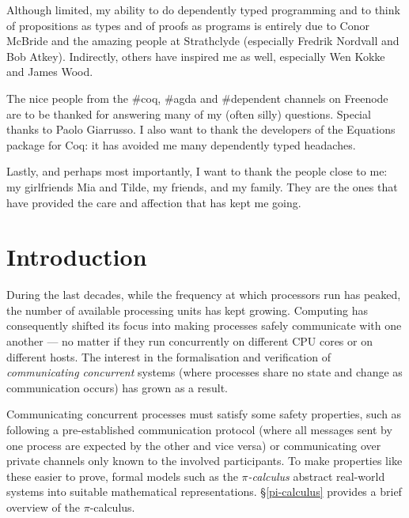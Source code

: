 \documentclass{mproj}
\newcommand{\picalc}{$\pi$-calculus}
\begin{document}
Although limited, my ability to do dependently typed programming and to think of propositions as types and of proofs as programs is entirely due to Conor McBride and the amazing people at Strathclyde (especially Fredrik Nordvall and Bob Atkey). Indirectly, others have inspired me as well, especially Wen Kokke and James Wood.

The nice people from the \#coq, \#agda and \#dependent channels on Freenode are to be thanked for answering many of my (often silly) questions. Special thanks to Paolo Giarrusso. I also want to thank the developers of the Equations package for Coq: it has avoided me many dependently typed headaches.

Lastly, and perhaps most importantly, I want to thank the people close to me: my girlfriends Mia and Tilde, my friends, and my family. They are the ones that have provided the care and affection that has kept me going.

\tableofcontents

\chapter{Introduction}\label{intro}

During the last decades, while the frequency at which processors run has peaked, the number of available processing units has kept growing. Computing has consequently shifted its focus into making processes safely communicate with one another --- no matter if they run concurrently on different CPU cores or on different hosts. The interest in the formalisation and verification of \emph{communicating concurrent} systems (where processes share no state and change as communication occurs) has grown as a result.

Communicating concurrent processes must satisfy some safety properties, such as following a pre-established communication protocol (where all messages sent by one process are expected by the other and vice versa) or communicating over private channels only known to the involved participants. To make properties like these easier to prove, formal models such as the \emph{\picalc{}} \cite{Walker1989,Milner1989,Milner1991,Sangiorgi2001} abstract real-world systems into suitable mathematical representations. \S \ref{pi-calculus} provides a brief overview of the \picalc.
\end{document}
